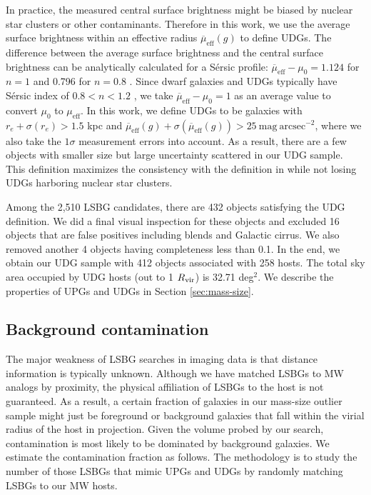 \documentclass[twocolumn,astrosymb,twocolappendix]{aastex631}
\newcommand{\sbunit}{\mathrm{mag\ arcsec}^{-2}}
\newcommand{\sbeff}{\overline{\mu}_{\mathrm{eff}}(g)}
\newcommand{\sersic}{S\'ersic}
\begin{document}
\begin{CJK*}{UTF8}{gbsn}
In practice, the measured central surface brightness might be biased by nuclear star clusters \citep{Neumayer2020,ELVES-II,Somalwar2020} or other contaminants. Therefore in this work, we use the average surface brightness within an effective radius $\sbeff$ to define UDGs. The difference between the average surface brightness and the central surface brightness can be analytically calculated for a \sersic{} profile: $\overline{\mu}_{\mathrm{eff}} - \mu_0 = 1.124$ for $n=1$ and 0.796 for $n=0.8$ \citep{Graham2005,Yagi2016}. Since dwarf galaxies and UDGs typically have \sersic{} index of $0.8 < n < 1.2$ \citep[e.g.,][]{vanDokkum2015,ELVES-I}, we take $\overline{\mu}_{\mathrm{eff}} - \mu_0 = 1$ as an average value to convert $\mu_0$ to $\mu_{\mathrm{eff}}$. In this work, we define UDGs to be galaxies with $r_e+\sigma(r_e) > 1.5$ kpc and $\sbeff + \sigma(\sbeff) > 25\ \sbunit$, where we also take the $1\sigma$ measurement errors into account. As a result, there are a few objects with smaller size but large uncertainty scattered in our UDG sample. This definition maximizes the consistency with the definition in \citet{vanDokkum2015} while not losing UDGs harboring nuclear star clusters.

Among the 2,510 LSBG candidates, there are 432 objects satisfying the UDG definition. We did a final visual inspection for these objects and excluded 16 objects that are false positives including blends and Galactic cirrus. We also removed another 4 objects having completeness less than 0.1. In the end, we obtain our UDG sample with 412 objects associated with 258 hosts. The total sky area occupied by UDG hosts (out to 1 $R_{\rm{vir}}$) is 32.71 deg$^{2}$. We describe the properties of UPGs and UDGs in Section \ref{sec:mass-size}.

\subsection{Background contamination}\label{sec:bkg}
The major weakness of LSBG searches in imaging data is that distance information is typically unknown. Although we have matched LSBGs to MW analogs by proximity, the physical affiliation of LSBGs to the host is not guaranteed. As a result, a certain fraction of galaxies in our mass-size outlier sample might just be foreground or background galaxies that fall within the virial radius of the host in projection. Given the volume probed by our search, contamination is most likely to be dominated by background galaxies. We estimate the contamination fraction as follows. The methodology is to study the number of those LSBGs that mimic UPGs and UDGs by randomly matching LSBGs to our MW hosts.


\end{CJK*}
\end{document}
